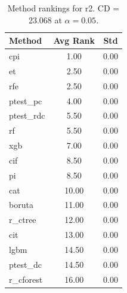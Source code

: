 \begin{table}[h]
\centering
\caption{Method rankings for r2. CD = 23.068 at $\alpha=0.05$.}
\label{tab:ranks_r2}
\begin{tabular}{lcc}
\toprule
Method & Avg Rank & Std \\
\midrule
cpi & 1.00 & 0.00 \\
et & 2.50 & 0.00 \\
rfe & 2.50 & 0.00 \\
ptest_pc & 4.00 & 0.00 \\
ptest_rdc & 5.50 & 0.00 \\
rf & 5.50 & 0.00 \\
xgb & 7.00 & 0.00 \\
cif & 8.50 & 0.00 \\
pi & 8.50 & 0.00 \\
cat & 10.00 & 0.00 \\
boruta & 11.00 & 0.00 \\
r_ctree & 12.00 & 0.00 \\
cit & 13.00 & 0.00 \\
lgbm & 14.50 & 0.00 \\
ptest_dc & 14.50 & 0.00 \\
r_cforest & 16.00 & 0.00 \\
\bottomrule
\end{tabular}
\end{table}